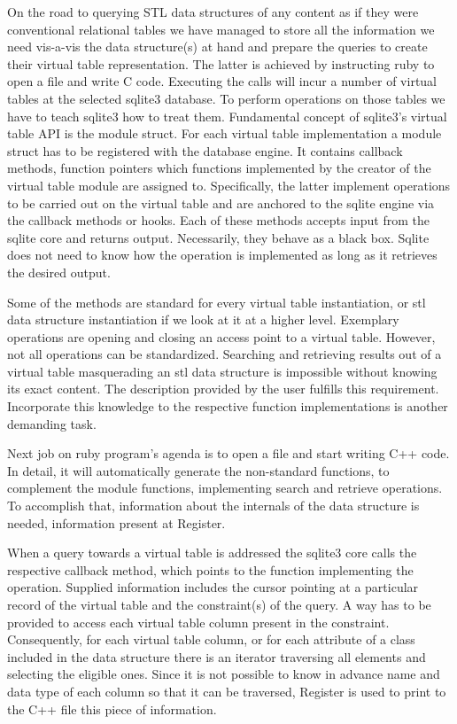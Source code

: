 \documentclass[pdftex, 11pt, a4paper]{report}
\begin{document}
\par
On the road to querying STL data structures of any content as if they were conventional relational tables we have managed to store all the information we need vis-a-vis the data structure(s) at hand and prepare the queries to create their virtual table representation. The latter is achieved by instructing ruby to open a file and write C code. Executing the calls will incur a number of virtual tables at the selected sqlite3 database. To perform operations on those tables we have to teach sqlite3 how to treat them. Fundamental concept of sqlite3's virtual table API is the module struct. For each virtual table implementation a module struct has to be registered with the database engine. It contains callback methods, function pointers which functions implemented by the creator of the virtual table module are assigned to. Specifically, the latter implement operations to be carried out on the virtual table and are anchored to the sqlite engine via the callback methods or hooks. Each of these methods accepts input from the sqlite core and returns output. Necessarily, they behave as a black box. Sqlite does not need to know how the operation is implemented as long as it retrieves the desired output. 
\par
Some of the methods are standard for every virtual table instantiation, or stl data structure instantiation if we look at it at a higher level. Exemplary operations are opening and closing an access point to a virtual table. However, not all operations can be standardized. Searching and retrieving results out of a virtual table masquerading an stl data structure is impossible without knowing its exact content. The description provided by the user fulfills this requirement. Incorporate this knowledge to the respective function implementations is another demanding task.
\par
Next job on ruby program's agenda is to open a file and start writing C++ code. In detail, it will automatically generate the non-standard functions, to complement the module functions, implementing search and retrieve operations. To accomplish that, information about the internals of the data structure is needed, information present at Register. 
\par
When a query towards a virtual table is addressed the sqlite3 core calls the respective callback method, which points to the function implementing the operation. Supplied information includes the cursor pointing at a particular record of the virtual table and the constraint(s) of the query. A way has to be provided to access each virtual table column present in the constraint. Consequently, for each virtual table column, or for each attribute of a class included in the data structure there is an iterator traversing all elements and selecting the eligible ones. Since it is not possible to know in advance name and data type of each column so that it can be traversed, Register is used to print to the C++ file this piece of information.
\end{document}

